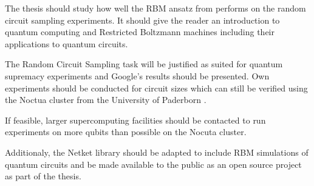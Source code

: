 The thesis should study how well the RBM ansatz from \cite{jnsson2018neuralnetwork} performs on 
the random circuit sampling experiments. It should give the reader an introduction to 
quantum computing and Restricted Boltzmann machines including their applications to quantum circuits.

The Random Circuit Sampling task will be justified as suited for quantum supremacy experiments and 
Google's results should be presented. Own experiments should be conducted for circuit sizes which
can still be verified using the Noctua cluster from the University of Paderborn \cite{noctua2020}.

If feasible, larger supercomputing facilities should be 
contacted to run experiments on more qubits than possible on the Nocuta cluster.

Additionaly, the Netket library \cite{netket:2019} should be adapted to include RBM simulations of quantum circuits and be 
made available to the public as an open source project as part of the thesis.